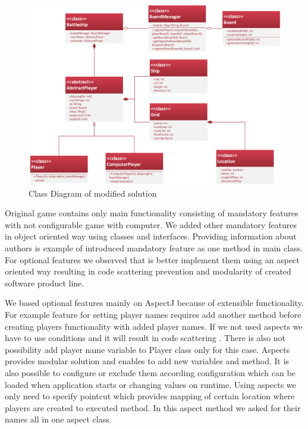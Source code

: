 \documentclass[11pt,english,a4paper,twoside]{article}
\begin{document}
\begin{figure}[H]  %
					\begin{center}
									\includegraphics[width=\linewidth]{fig/refactoredSchema.png}
									\caption{Class Diagram of modified solution}
									\label{refactoredSchema}
					\end{center}
\end{figure}

Original game contains only main functionality consisting of mandatory features with not configurable game with computer. We added other mandatory features in object oriented way using classes and interfaces. Providing information about authors is example of introduced mandatory feature as one method in main class. For optional features we observed that is better implement them using an aspect oriented way resulting in code scattering prevention and modularity of created software product line. 

We based optional features mainly on AspectJ because of extensible functionality. For example feature for setting player names requires add another method before creating players functionality with added player names. If we not used aspects we have to use conditions and it will result in code scattering \cite{laddad_aspectj_2003}. There is also not possibility add player name variable to Player class only for this case. Aspects provides modular solution and enables to add new variables and method. It is also possible to configure or exclude them according configuration which can be loaded when application starts or changing values on runtime. Using aspects we only need to specify pointcut which provides mapping of certain location where players are created  to executed method. In this aspect method we asked for their names all in one aspect class. 
\end{document}
